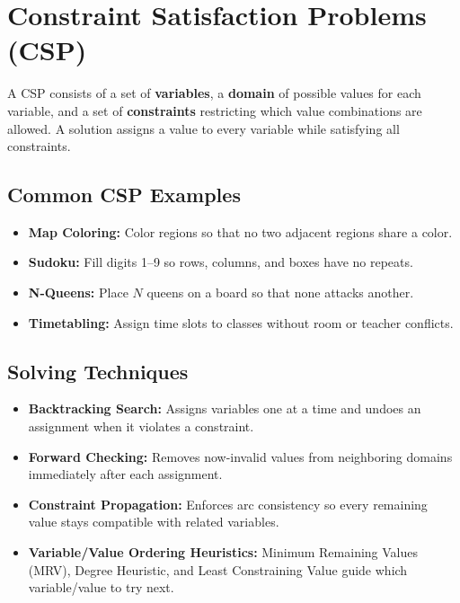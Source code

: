 \documentclass[11pt,a4paper]{article}
\begin{document}
\section{Constraint Satisfaction Problems (CSP)}

\begin{definitionbox}
A CSP consists of a set of \textbf{variables}, a \textbf{domain} of possible values for each variable, and a set of \textbf{constraints} restricting which value combinations are allowed. A solution assigns a value to every variable while satisfying all constraints.
\end{definitionbox}

\subsection{Common CSP Examples}
\begin{itemize}[leftmargin=*]
  \item \textbf{Map Coloring:} Color regions so that no two adjacent regions share a color.
  \item \textbf{Sudoku:} Fill digits 1--9 so rows, columns, and boxes have no repeats.
  \item \textbf{N-Queens:} Place $N$ queens on a board so that none attacks another.
  \item \textbf{Timetabling:} Assign time slots to classes without room or teacher conflicts.
\end{itemize}

\subsection{Solving Techniques}
\begin{itemize}[leftmargin=*]
  \item \textbf{Backtracking Search:} Assigns variables one at a time and undoes an assignment when it violates a constraint.
  \item \textbf{Forward Checking:} Removes now-invalid values from neighboring domains immediately after each assignment.
  \item \textbf{Constraint Propagation:} Enforces arc consistency so every remaining value stays compatible with related variables.
  \item \textbf{Variable/Value Ordering Heuristics:} Minimum Remaining Values (MRV), Degree Heuristic, and Least Constraining Value guide which variable/value to try next.
\end{itemize}
\end{document}
